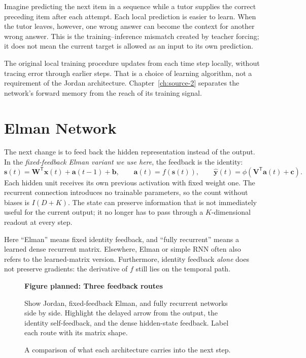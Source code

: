 \documentclass[11pt, oneside]{book}
\newcommand{\T}{^{\mathsf{T}}}           %
\let\originalsection\section
\renewcommand{\section}{\Needspace{7\baselineskip}\originalsection}
\newcommand{\figureplaceholder}[5]{%
\begin{figure}[htbp]
\centering
\begin{tcolorbox}[unbreakable,width=\linewidth,height=#1,colback=accent!3,
  colframe=accent!30,boxrule=0.5pt,arc=2.5mm,sharp corners=all,
  valign=center,halign=center,fontupper=\small]
{\bfseries\color{accent}Figure planned: #2}\par\medskip
{\color{gray!75!black}#3}
\end{tcolorbox}
\caption{#4}\label{#5}
\end{figure}}
\begin{document}
\begin{intbox}[title={Learning with a correct previous answer}]
Imagine predicting the next item in a sequence while a tutor supplies the correct preceding item after each attempt. Each local prediction is easier to learn. When the tutor leaves, however, one wrong answer can become the context for another wrong answer. This is the training--inference mismatch created by teacher forcing; it does not mean the current target is allowed as an input to its own prediction.
\end{intbox}

The original local training procedure updates from each time step locally, without tracing error through earlier steps. That is a choice of learning algorithm, not a requirement of the Jordan architecture. Chapter~\ref{ch:source-2} separates the network's forward memory from the reach of its training signal.

\section{Elman Network}\label{sec:source-1-2}
The next change is to feed back the hidden representation instead of the output. In the \emph{fixed-feedback Elman variant we use here}, the feedback is the identity:
\[
 \mathbf{s}(t)=\mathbf{W}\T\mathbf{x}(t)+\mathbf{a}(t-1)+\mathbf{b},\qquad
 \mathbf{a}(t)=f(\mathbf{s}(t)),\qquad
 \widehat{\mathbf{y}}(t)=\phi(\mathbf{V}\T\mathbf{a}(t)+\mathbf{c}).
\]
Each hidden unit receives its own previous activation with fixed weight one. The recurrent connection introduces no trainable parameters, so the count without biases is $I(D+K)$. The state can preserve information that is not immediately useful for the current output; it no longer has to pass through a $K$-dimensional readout at every step.

\begin{notebox}[title={Watch out for the name Elman}]
Here ``Elman'' means fixed identity feedback, and ``fully recurrent'' means a learned dense recurrent matrix. Elsewhere, Elman or simple RNN often also refers to the learned-matrix version. Furthermore, identity feedback \emph{alone} does not preserve gradients: the derivative of $f$ still lies on the temporal path.
\end{notebox}

\figureplaceholder{3.3cm}{Three feedback routes}{Show Jordan, fixed-feedback Elman, and fully recurrent networks side by side. Highlight the delayed arrow from the output, the identity self-feedback, and the dense hidden-state feedback. Label each route with its matrix shape.}{A comparison of what each architecture carries into the next step.}{fig:feedback-routes}
\end{document}
